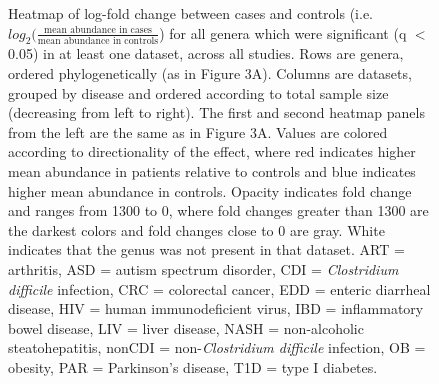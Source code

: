 \newpage
\begin{figure}[h]
	\begin{center}
    \captionsetup{font=footnotesize,labelfont=footnotesize}
	\caption{Heatmap of log-fold change between cases and controls (i.e. $log_2(\frac{\text{mean abundance in cases}}{\text{mean abundance in controls}}$) for all genera which were significant (q $<$ 0.05) in at least one dataset, across all studies. Rows are genera, ordered phylogenetically (as in Figure 3A). Columns are datasets, grouped by disease and ordered according to total sample size (decreasing from left to right). The first and second heatmap panels from the left are the same as in Figure 3A. Values are colored according to directionality of the effect, where red indicates higher mean abundance in patients relative to controls and blue indicates higher mean abundance in controls. Opacity indicates fold change and ranges from 1300 to 0, where fold changes greater than 1300 are the darkest colors and fold changes close to 0 are gray. White indicates that the genus was not present in that dataset. ART = arthritis, ASD = autism spectrum disorder, CDI = \textit{Clostridium difficile} infection, CRC = colorectal cancer, EDD = enteric diarrheal disease, HIV = human immunodeficient virus, IBD = inflammatory bowel disease, LIV = liver disease, NASH = non-alcoholic steatohepatitis, nonCDI = non-\textit{Clostridium difficile} infection, OB = obesity, PAR = Parkinson's disease, T1D = type I diabetes.
}
	\label{fig:overall_heatmap_foldchange}
	\end{center}
\end{figure}

\begin{singlespace}


\end{singlespace}
